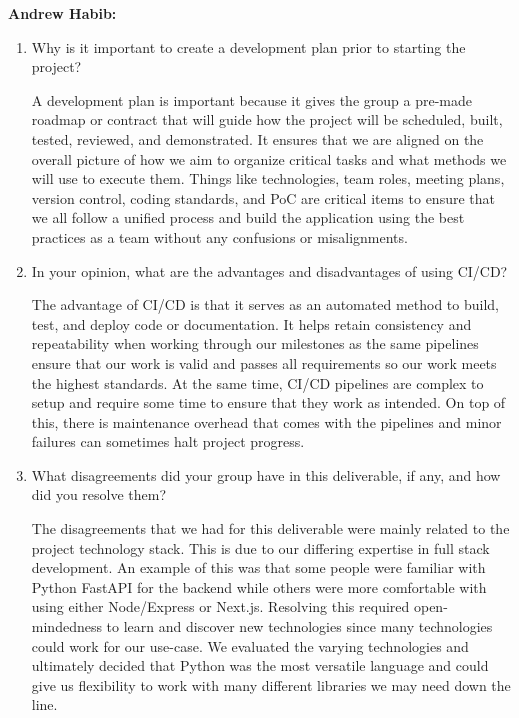 \documentclass{article}
\begin{document}
\textbf{Andrew Habib:}

\begin{enumerate}
    \item Why is it important to create a development plan prior to starting
          the project?

          A development plan is important because it gives the group a pre-made
          roadmap or contract that will guide how the project will be
          scheduled, built, tested, reviewed, and demonstrated. It ensures that
          we are aligned on the overall picture of how we aim to organize
          critical tasks and what methods we will use to execute them. Things
          like technologies, team roles, meeting plans, version control, coding
          standards, and PoC are critical items to ensure that we all follow a
          unified process and build the application using the best practices as
          a team without any confusions or misalignments.

    \item In your opinion, what are the advantages and disadvantages of using
          CI/CD?

          The advantage of CI/CD is that it serves as an automated method to
          build, test, and deploy code or documentation. It helps retain
          consistency and repeatability when working through our milestones as
          the same pipelines ensure that our work is valid and passes all
          requirements so our work meets the highest standards. At the same
          time, CI/CD pipelines are complex to setup and require some time to
          ensure that they work as intended. On top of this, there is
          maintenance overhead that comes with the pipelines and minor failures
          can sometimes halt project progress.

    \item What disagreements did your group have in this deliverable, if any,
          and how did you resolve them?

          The disagreements that we had for this deliverable were mainly
          related to the project technology stack. This is due to our differing
          expertise in full stack development. An example of this was that some
          people were familiar with Python FastAPI for the backend while others
          were more comfortable with using either Node/Express or Next.js.
          Resolving this required open-mindedness to learn and discover new
          technologies since many technologies could work for our use-case. We
          evaluated the varying technologies and ultimately decided that Python
          was the most versatile language and could give us flexibility to work
          with many different libraries we may need down the line.

\end{enumerate}
\end{document}
